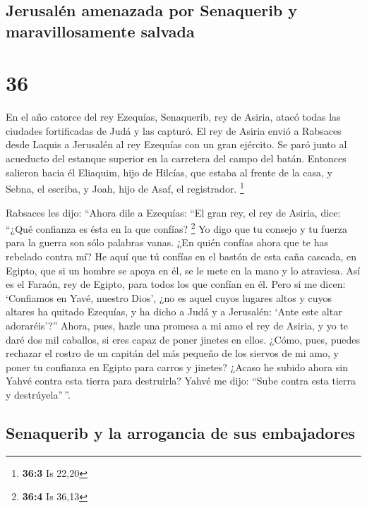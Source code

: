 \hypertarget{jerusaluxe9n-amenazada-por-senaquerib-y-maravillosamente-salvada}{%
\subsection{Jerusalén amenazada por Senaquerib y maravillosamente
salvada}\label{jerusaluxe9n-amenazada-por-senaquerib-y-maravillosamente-salvada}}

\hypertarget{section-35}{%
\section{36}\label{section-35}}

 En el año catorce del rey Ezequías, Senaquerib, rey de
Asiria, atacó todas las ciudades fortificadas de Judá y las capturó.
 El rey de Asiria envió a Rabsaces desde Laquis a
Jerusalén al rey Ezequías con un gran ejército. Se paró junto al
acueducto del estanque superior en la carretera del campo del batán.
 Entonces salieron hacia él Eliaquim, hijo de Hilcías, que
estaba al frente de la casa, y Sebna, el escriba, y Joah, hijo de Asaf,
el registrador. \footnote{\textbf{36:3} Is 22,20}

 Rabsaces les dijo: ``Ahora dile a Ezequías: ``El gran
rey, el rey de Asiria, dice: ``¿Qué confianza es ésta en la que confías?
\footnote{\textbf{36:4} Is 36,13}  Yo digo que tu consejo
y tu fuerza para la guerra son sólo palabras vanas. ¿En quién confías
ahora que te has rebelado contra mí?  He aquí que tú
confías en el bastón de esta caña cascada, en Egipto, que si un hombre
se apoya en él, se le mete en la mano y lo atraviesa. Así es el Faraón,
rey de Egipto, para todos los que confían en él.  Pero si
me dicen: `Confiamos en Yavé, nuestro Dios', ¿no es aquel cuyos lugares
altos y cuyos altares ha quitado Ezequías, y ha dicho a Judá y a
Jerusalén: `Ante este altar adoraréis'?''  Ahora, pues,
hazle una promesa a mi amo el rey de Asiria, y yo te daré dos mil
caballos, si eres capaz de poner jinetes en ellos.  ¿Cómo,
pues, puedes rechazar el rostro de un capitán del más pequeño de los
siervos de mi amo, y poner tu confianza en Egipto para carros y jinetes?
 ¿Acaso he subido ahora sin Yahvé contra esta tierra para
destruirla? Yahvé me dijo: ``Sube contra esta tierra y destrúyela''\,''.

\hypertarget{senaquerib-y-la-arrogancia-de-sus-embajadores}{%
\subsection{Senaquerib y la arrogancia de sus
embajadores}\label{senaquerib-y-la-arrogancia-de-sus-embajadores}}

